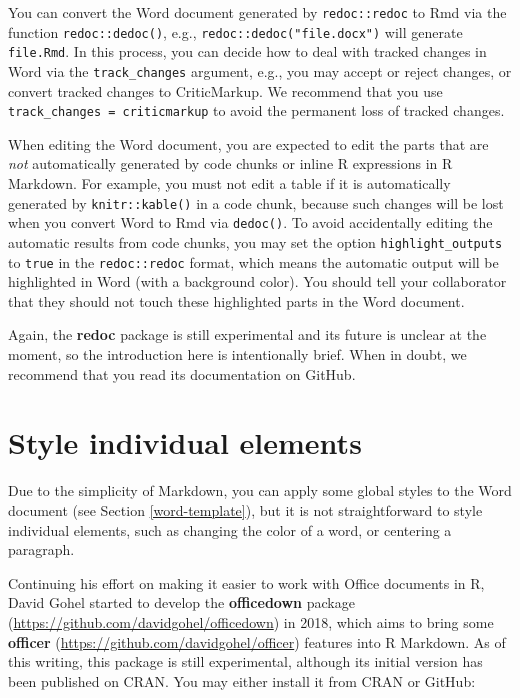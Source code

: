 \documentclass[
  11pt,
]{krantz}
\begin{document}
You can convert the Word document generated by \texttt{redoc::redoc} to Rmd via the function \texttt{redoc::dedoc()}, e.g., \texttt{redoc::dedoc("file.docx")} will generate \texttt{file.Rmd}. In this process, you can decide how to deal with tracked changes in Word via the \texttt{track\_changes} argument, e.g., you may accept or reject changes, or convert tracked changes to CriticMarkup. We recommend that you use \texttt{track\_changes\ =\ \textquotesingle{}criticmarkup\textquotesingle{}} to avoid the permanent loss of tracked changes.

When editing the Word document, you are expected to edit the parts that are \emph{not} automatically generated by code chunks or inline R expressions in R Markdown. For example, you must not edit a table if it is automatically generated by \texttt{knitr::kable()} in a code chunk, because such changes will be lost when you convert Word to Rmd via \texttt{dedoc()}. To avoid accidentally editing the automatic results from code chunks, you may set the option \texttt{highlight\_outputs} to \texttt{true} in the \texttt{redoc::redoc} format, which means the automatic output will be highlighted in Word (with a background color). You should tell your collaborator that they should not touch these highlighted parts in the Word document.

Again, the \textbf{redoc} package is still experimental and its future is unclear at the moment, so the introduction here is intentionally brief. When in doubt, we recommend that you read its documentation on GitHub.

\hypertarget{word-officedown}{%
\section{Style individual elements}\label{word-officedown}}

Due to the simplicity of Markdown, you can apply some global styles to the Word document (see Section \ref{word-template}), but it is not straightforward to style individual elements, such as changing the color of a word, or centering a paragraph.

Continuing his effort on making it easier to work with Office documents in R, David Gohel started to develop the \textbf{officedown} package (\url{https://github.com/davidgohel/officedown}) in 2018, which aims to bring some \textbf{officer} (\url{https://github.com/davidgohel/officer}) features into R Markdown. As of this writing, this package is still experimental, although its initial version has been published on CRAN. You may either install it from CRAN or GitHub:
\end{document}
